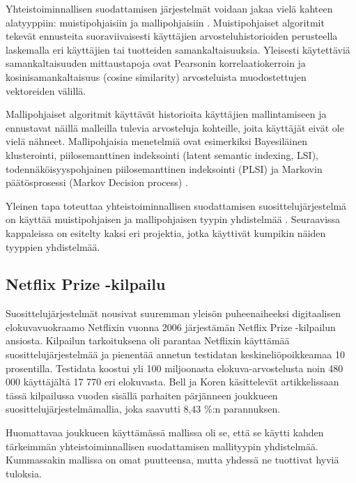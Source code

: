 \documentclass[12pt,finnish]{tktltiki2}
\theoremstyle{definition}
\theoremstyle{remark}
\begin{document}
         Yhteistoiminnallisen suodattamisen järjestelmät voidaan jakaa vielä kahteen alatyyppiin: muistipohjaisiin ja mallipohjaisiin \cite{Das:2007:GNP:1242572.1242610}. Muistipohjaiset algoritmit tekevät ennusteita suoraviivaisesti käyttäjien arvosteluhistorioiden perusteella laskemalla eri käyttäjien tai tuotteiden samankaltaisuuksia. Yleisesti käytettäviä samankaltaisuuden mittaustapoja ovat Pearsonin korrelaatiokerroin ja kosinisamankaltaisuus (cosine similarity) arvosteluista muodostettujen vektoreiden välillä.
         
Mallipohjaiset algoritmit käyttävät historioita käyttäjien mallintamiseen ja ennustavat näillä malleilla tulevia arvosteluja kohteille, joita käyttäjät eivät ole vielä nähneet. Mallipohjaisia menetelmiä ovat esimerkiksi Bayesiläinen klusterointi, piilosemanttinen indeksointi (latent semantic indexing, LSI), todennäköisyyspohjainen piilosemanttinen indeksointi (PLSI) ja Markovin päätösprosessi (Markov Decision process) \cite{Das:2007:GNP:1242572.1242610}.
        
Yleinen tapa toteuttaa yhteistoiminnallisen suodattamisen suosittelujärjestelmä on käyttää muistipohjaisen ja mallipohjaisen tyypin yhdistelmää \cite{Burke:2002:HRS:586321.586352}. Seuraavissa kappaleissa on esitelty kaksi eri projektia, jotka käyttivät kumpikin näiden tyyppien yhdistelmää.

\subsection{Netflix Prize -kilpailu}

        Suosittelujärjestelmät nousivat suuremman yleisön puheenaiheeksi digitaalisen elokuvavuokraamo Netflixin vuonna 2006 järjestämän Netflix Prize -kilpailun ansiosta. Kilpailun tarkoituksena oli parantaa Netflixin käyttämää suosittelujärjestelmää ja pienentää annetun testidatan keskineliöpoikkeamaa 10 prosentilla. Testidata koostui yli 100 miljoonasta elokuva-arvostelusta noin 480 000 käyttäjältä 17 770 eri elokuvasta. Bell ja Koren käsittelevät artikkelissaan \cite{Bell:2007:LNP:1345448.1345465} tässä kilpailussa vuoden sisällä parhaiten pärjänneen joukkueen suosittelujärjestelmämallia, joka saavutti 8,43 \%:n parannuksen.
        
        Huomattavaa joukkueen käyttämässä mallissa oli se, että se käytti kahden tärkeimmän yhteistoiminnallisen suodattamisen mallityypin yhdistelmää. Kummassakin mallissa on omat puutteensa, mutta yhdessä ne tuottivat hyviä tuloksia.
        
\end{document}
